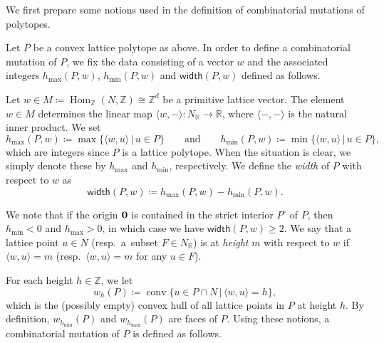 \documentclass[11pt]{article}
\numberwithin{equation}{section}
\numberwithin{equation}{section}
\numberwithin{figure}{section}
\numberwithin{table}{section}
\newcommand{\ZZ}{\mathbb{Z}}
\newcommand{\RR}{\mathbb{R}}
\newcommand{\Hom}{\operatorname{Hom}}
\newcommand{\width}{\mathsf{width}}
\begin{document}
We first prepare some notions used in the definition of combinatorial mutations of polytopes.

\begin{Definition}\label{def_mutation_data}
Let $P$ be a convex lattice polytope as above.
In order to define a combinatorial mutation of $P$, we fix the data consisting of a vector $w$ and the associated integers $h_{\max}(P,w)$,
$h_{\min}(P,w)$ and $\width(P,w)$ defined as follows.

Let $w\in M\coloneqq\Hom_\ZZ(N,\ZZ)\cong\ZZ^d$ be a primitive lattice vector.
The element $w\in M$ determines the linear map $\langle w,-\rangle\colon N_\RR\rightarrow \RR$, where $\langle-,- \rangle$ is the natural inner product.
We set
\begin{displaymath}
h_{\max}(P,w)\coloneqq{\max}\{\langle w,u\rangle \,|\, u\in P\} \qquad\text{and}\qquad
h_{\min}(P,w)\coloneqq{\min}\{\langle w,u\rangle \,|\, u\in P\},
\end{displaymath}
which are integers since $P$ is a lattice polytope.
When the situation is clear, we simply denote these by $h_{\max}$ and $h_{\min}$, respectively.
We define the \emph{width} of $P$ with respect to $w$ as
\begin{displaymath}
\width(P,w)\coloneqq h_{\max}(P,w)-h_{\min}(P,w).
\end{displaymath}
\end{Definition}

We note that if the origin ${\bf 0}$ is contained in the strict interior $P^\circ$ of $P$, then $h_{\min}<0$ and $h_{\max}>0$, in which case we have $\width(P,w)\ge2$.
We say that a lattice point $u\in N$ (resp.\ a~subset $F\in N_\RR$) is at \emph{height} $m$ with respect to $w$ if $\langle w,u\rangle=m$
(resp.\ $\langle w,u\rangle=m$ for any $u\in F$).

For each height $h\in\ZZ$, we let
\begin{displaymath}
w_h(P)\coloneqq\operatorname{conv}\{u\in P\cap N \,|\, \langle w,u\rangle=h\},
\end{displaymath}
which is the (possibly empty) convex hull of all lattice points in $P$ at height $h$.
By definition, $w_{h_{\min}}(P)$ and $w_{h_{\max}}(P)$ are faces of $P$.
Using these notions, a combinatorial mutation of $P$ is defined as follows.
\end{document}
